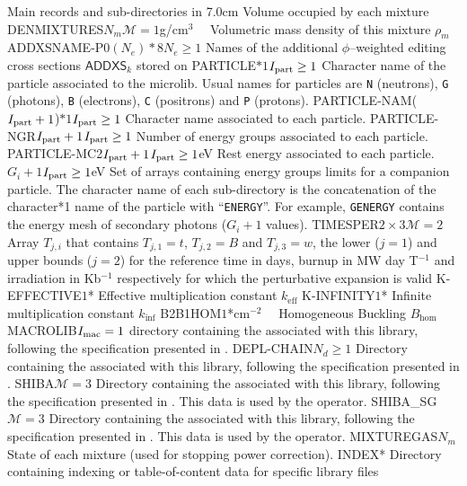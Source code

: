\begin{DescriptionEnregistrement}{Main records and sub-directories in }{7.0cm}
  {Volume occupied by each mixture}
\OptRealEnr
  {DENMIXTURES}{$N_{m}$}{$\mathcal{M}=1$}{g/cm$^{3}$~~}
  {Volumetric mass density of this mixture $\rho_{m}$}   
\OptCharEnr
  {ADDXSNAME-P0}{$(N_{e})*8$}{$N_{e}\ge 1$}
  {Names of the additional $\phi$--weighted editing cross sections $\mathsf{ADDXS}_{k}$ stored on }
\OptCharEnr
  {PARTICLE}{$*1$}{$I_{\rm part}\ge 1$} 
  {Character name of the particle associated to the microlib. Usual names for
  particles are {\tt N} (neutrons), {\tt G} (photons), {\tt B} (electrons),
  {\tt C} (positrons) and {\tt P} (protons).}
\OptCharEnr
  {PARTICLE-NAM}{($I_{\rm part}+1$)$*1$}{$I_{\rm part}\ge 1$} 
  {Character name associated to each particle.}
\OptIntEnr
  {PARTICLE-NGR}{$I_{\rm part}+1$}{$I_{\rm part}\ge 1$}
  {Number of energy groups associated to each particle.}
\OptRealEnr
  {PARTICLE-MC2}{$I_{\rm part}+1$}{$I_{\rm part}\ge 1$}{eV}
  {Rest energy associated to each particle.}
\OptRealVar
  {}{$G_i+1$}{$I_{\rm part}\ge 1$}{eV}
  {Set of arrays containing energy groups limits for a companion particle. The character name
  of each sub-directory is the concatenation of the character*1 name of the particle with ``{\tt ENERGY}''.
  For example, {\tt GENERGY} contains the energy mesh of secondary photons ($G_i+1$ values).}
\OptRealEnr
  {TIMESPER}{$2\times 3$}{$\mathcal{M}=2$}{}
  {Array $T_{j,i}$ that contains $T_{j,1}=t$, $T_{j,2}=B$ and $T_{j,3}=w$, the
   lower ($j=1$) and upper bounds ($j=2$) for the reference time in days, burnup
   in MW day T$^{-1}$ and irradiation in Kb$^{-1}$ respectively for which the
   perturbative expansion is valid}
\OptRealEnr
  {K-EFFECTIVE}{$1$}{*}{}
  {Effective multiplication constant $k_{\mathrm{eff}}$}
\OptRealEnr
  {K-INFINITY}{$1$}{*}{}
  {Infinite multiplication constant $k_{\mathrm{inf}}$}
\OptRealEnr
  {B2B1HOM}{$1$}{*}{cm$^{-2}$~~}
  {Homogeneous Buckling $B_{\mathrm{hom}}$}
\OptDirEnr
  {MACROLIB}{$I_{\rm mac} = 1$}
  {directory containing the  associated with this
  library, following the specification presented in .}
\OptDirEnr
  {DEPL-CHAIN}{$N_{d} \ge 1$}
  {Directory containing the  associated with this library, following
  the specification presented in .}
\OptDirEnr
  {SHIBA}{$\mathcal{M}=3$}
  {Directory containing the  associated with this
  library, following the specification presented in .
  This data is used by the  operator.}
\OptDirEnr
  {SHIBA\_SG}{$\mathcal{M}=3$}
  {Directory containing the  associated with this
  library, following the specification presented in .
  This data is used by the  operator.}
\IntEnr
  {MIXTUREGAS}{$N_{m}$}
  {State of each mixture (used for stopping power correction).}
\OptDirEnr
  {INDEX}{*}
  {Directory containing indexing or table-of-content data for specific library
  files}
\end{DescriptionEnregistrement}

